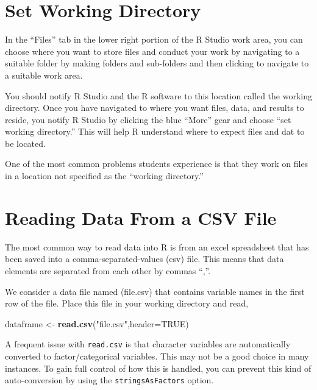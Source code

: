 \documentclass[
]{book}
\newenvironment{Shaded}{\begin{snugshade}}{\end{snugshade}}
\newcommand{\DataTypeTok}[1]{\textcolor[rgb]{0.13,0.29,0.53}{#1}}
\newcommand{\KeywordTok}[1]{\textcolor[rgb]{0.13,0.29,0.53}{\textbf{#1}}}
\newcommand{\NormalTok}[1]{#1}
\newcommand{\OtherTok}[1]{\textcolor[rgb]{0.56,0.35,0.01}{#1}}
\newcommand{\StringTok}[1]{\textcolor[rgb]{0.31,0.60,0.02}{#1}}
\begin{document}
\hypertarget{set-working-directory}{%
\section{Set Working Directory}\label{set-working-directory}}

In the ``Files'' tab in the lower right portion of the R Studio work area, you can choose where you want to store files and conduct your work by navigating to a suitable folder by making folders and sub-folders and then clicking to navigate to a suitable work area.

You should notify R Studio and the R software to this location called the working directory. Once you have navigated to where you want files, data, and results to reside, you notify R Studio by clicking the blue ``More'' gear and choose ``set working directory.'' This will help R understand where to expect files and dat to be located.

One of the most common problems students experience is that they work on files in a location not specified as the ``working directory.''

\hypertarget{reading-data-from-a-csv-file}{%
\section{Reading Data From a CSV File}\label{reading-data-from-a-csv-file}}

The most common way to read data into R is from an excel spreadsheet that has been saved into a comma-separated-values (csv) file. This means that data elements are separated from each other by commas ``,''.

We consider a data file named (file.csv) that contains variable names in the first row of the file. Place this file in your working directory and read,

\begin{Shaded}
\begin{Highlighting}[]
\NormalTok{dataframe <-}\StringTok{ }\KeywordTok{read.csv}\NormalTok{(}\StringTok{"file.csv"}\NormalTok{,}\DataTypeTok{header=}\OtherTok{TRUE}\NormalTok{)}
\end{Highlighting}
\end{Shaded}

A frequent issue with \texttt{read.csv} is that character variables are automatically converted to factor/categorical variables. This may not be a good choice in many instances. To gain full control of how this is handled, you can prevent this kind of auto-conversion by using the \texttt{stringsAsFactors} option.
\end{document}
